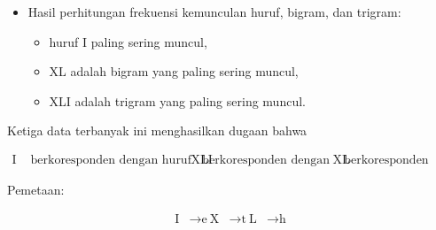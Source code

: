 \documentclass{article}
\begin{document}

\begin{itemize}
  \item Hasil perhitungan frekuensi kemunculan huruf, bigram, dan trigram:
  \begin{itemize}
    \item huruf I paling sering muncul,
    \item XL adalah bigram yang paling sering muncul,
    \item XLI adalah trigram yang paling sering muncul.
  \end{itemize}
\end{itemize}

Ketiga data terbanyak ini menghasilkan dugaan bahwa

\begin{align*}
  \text{I} & \text{ berkoresponden dengan huruf plainteks e,}\
  \text{XLI} & \text{ berkoresponden dengan the,}\
  \text{XL} & \text{ berkoresponden dengan th}
\end{align*}

Pemetaan:

\begin{align*}
  \text{I} & \rightarrow \text{e}\
  \text{X} & \rightarrow \text{t}\
  \text{L} & \rightarrow \text{h}
\end{align*}
\end{document}
